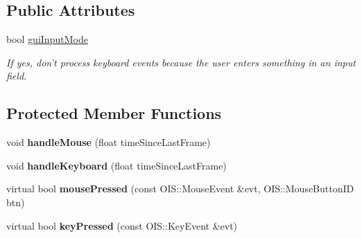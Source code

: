 \subsection*{\-Public \-Attributes}
\begin{DoxyCompactItemize}
\item 
\hypertarget{classGameInputHandler_a01285ca4208442ae37f5555d50d404ac}{
bool \hyperlink{classGameInputHandler_a01285ca4208442ae37f5555d50d404ac}{gui\-Input\-Mode}}
\label{dc/d26/classGameInputHandler_a01285ca4208442ae37f5555d50d404ac}

\begin{DoxyCompactList}\small\item\em \-If yes, don't process keyboard events because the user enters something in an input field. \end{DoxyCompactList}\end{DoxyCompactItemize}
\subsection*{\-Protected \-Member \-Functions}
\begin{DoxyCompactItemize}
\item 
\hypertarget{classGameInputHandler_a95015b4720dbbcf88a2ca24e854fc684}{
void {\bfseries handle\-Mouse} (float time\-Since\-Last\-Frame)}
\label{dc/d26/classGameInputHandler_a95015b4720dbbcf88a2ca24e854fc684}

\item 
\hypertarget{classGameInputHandler_a44da21ce83cc18e7853ca8c9e6ab2863}{
void {\bfseries handle\-Keyboard} (float time\-Since\-Last\-Frame)}
\label{dc/d26/classGameInputHandler_a44da21ce83cc18e7853ca8c9e6ab2863}

\item 
\hypertarget{classGameInputHandler_a49e5283e506fbafc6b931b97041215c8}{
virtual bool {\bfseries mouse\-Pressed} (const \-O\-I\-S\-::\-Mouse\-Event \&evt, \-O\-I\-S\-::\-Mouse\-Button\-I\-D btn)}
\label{dc/d26/classGameInputHandler_a49e5283e506fbafc6b931b97041215c8}

\item 
\hypertarget{classGameInputHandler_af1e4c92860210a8c7913c5584ff41d85}{
virtual bool {\bfseries key\-Pressed} (const \-O\-I\-S\-::\-Key\-Event \&evt)}
\label{dc/d26/classGameInputHandler_af1e4c92860210a8c7913c5584ff41d85}

\end{DoxyCompactItemize}
